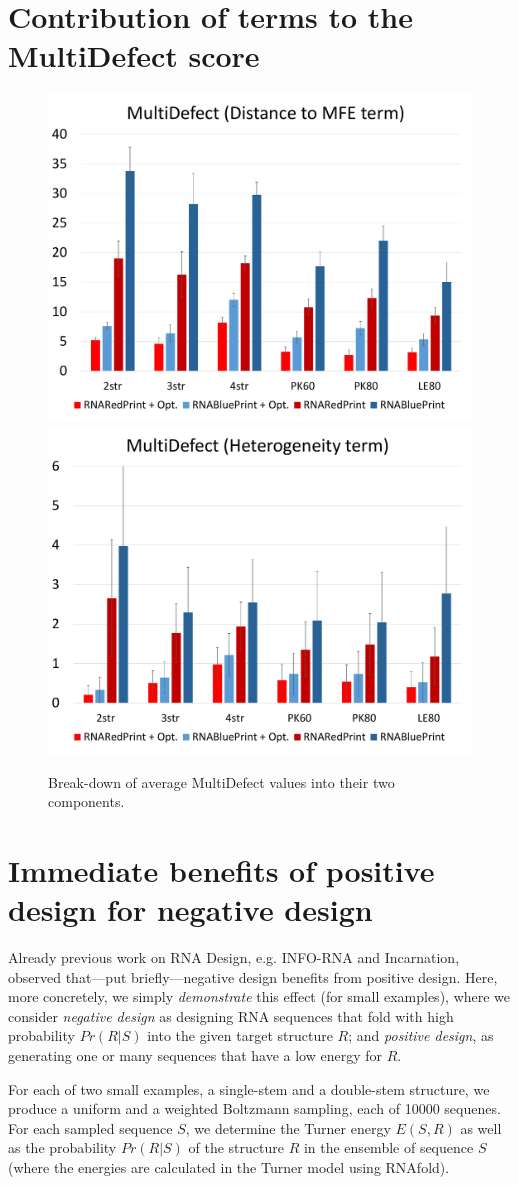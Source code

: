\documentclass[10pt]{article}
\newcommand{\Def}[1]{\emph{#1}}
\begin{document}
\section{Contribution of terms to the MultiDefect score}
\label{sec:improvements}
\begin{figure}[h!]
\includegraphics[width=.48\textwidth]{Figs/statistics-Term1}
\includegraphics[width=.48\textwidth]{Figs/statistics-Term2}
\caption{Break-down of average MultiDefect values into their two components.}
\end{figure}


\section{Immediate benefits of positive design for negative design}

Already previous work on RNA Design, e.g. INFO-RNA and Incarnation, observed
that---put briefly---negative design benefits from positive design. Here, more
concretely, we simply \emph{demonstrate} this effect (for small examples), where
we consider \Def{negative design} as  
designing RNA sequences that fold with high probability $Pr(R|S)$ into the
given target structure $R$; and \Def{positive design}, as generating one or
many sequences that have a low energy for $R$.

For each of two small examples, a single-stem and a double-stem structure, we produce a uniform and a weighted Boltzmann
sampling, each of 10000 sequenes. For each sampled sequence $S$, we determine
the Turner energy $E(S,R)$ as well as the
probability $Pr(R|S)$ of the structure $R$ in the ensemble of sequence $S$ 
(where the energies are calculated in the Turner model using RNAfold). 
\end{document}
